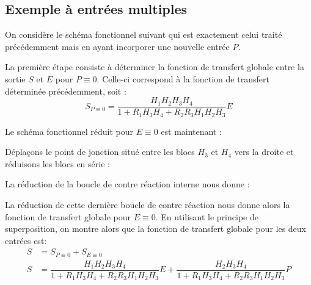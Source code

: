 \subsection{Exemple à entrées multiples}

On considère le schéma fonctionnel suivant qui est exactement celui traité
précédemment mais en ayant incorporer une nouvelle entrée $P$.

\begin{center}
    
\end{center}

La première étape consiste à déterminer la fonction de transfert globale entre
la sortie $S$ et $E$ pour $P\equiv0$.
Celle-ci correspond à la fonction de transfert déterminée précédemment, soit :
$$
     S_{P\equiv0}=\dfrac{H_1H_2H_3H_4}{1+R_1H_3H_4+R_2R_3H_1H_2H_3}E
$$

Le schéma fonctionnel réduit pour $E\equiv0$ est maintenant :

\begin{center}
    
\end{center}

Déplaçons le point de jonction situé entre les blocs $H_3$ et $H_4$ 
vers la droite et réduisons les blocs en série :

\begin{center}
    
\end{center}

La réduction de la boucle de contre réaction interne nous donne :

\begin{center}
    
\end{center}

La réduction de cette dernière boucle de contre réaction nous donne alors
la fonction de transfert globale pour $E\equiv0$. 
En utilisant le principe de superposition, on montre alors que la fonction 
de transfert globale pour les deux entrées est:
\begin{align*}
    S&=S_{P\equiv 0}+S_{E\equiv 0} \\
    S&=\dfrac{H_1H_2H_3H_4}{1+R_1H_3H_4+R_2R_3H_1H_2H_3} E + 
       \dfrac{H_2H_3H_4}{1+R_1H_3H_4+R_2R_3H_1H_2H_3} P 
\end{align*}


